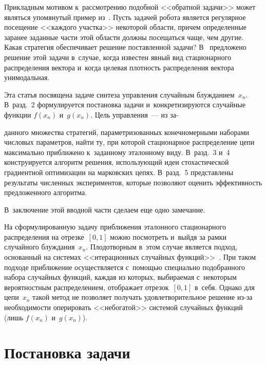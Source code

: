 \begin{multicols}{2}
Прикладным мотивом к~рас\-смот\-ре\-нию по\-доб\-ной <<обратной задачи>> 
может являться упомянутый пример из~\cite{3-kr}. Пусть задачей робота 
является регулярное посещение <<каж\-до\-го участка>> некоторой об\-ласти, 
причем определенные заранее заданные час\-ти этой об\-ласти должны 
посещаться чаще, чем другие. Какая стратегия обеспечивает решение 
поставленной задачи? В~\cite{3-kr} предложено решение этой задачи 
в~случае, когда известен явный вид стационарного распределения вектора 
и~когда целевая плот\-ность распределения вектора уни\-мо\-дальная.
{

}
  
  Эта статья посвящена задаче синтеза управ\-ле\-ния случайным 
блуж\-да\-ни\-ем~$x_n$. В~разд.~2 формулируется постановка задачи 
и~конкретизируются случайные функции $f(x_n)$ и~$g(x_n)$. Цель 
управления~--- из за-\linebreak\vspace*{-12pt}

\columnbreak

\noindent
данного множества стратегий, па\-ра\-мет\-ри\-зо\-ван\-ных 
конечномерными наборами чис\-ло\-вых па\-ра\-мет\-ров, найти ту, при которой 
стационарное распределение цепи максимально приближено к~заданному 
эталонному виду. В~разд.~3 и~4 конструируется алгоритм решения, 
использующий идеи стохастической градиентной оптимизации на 
марковских цепях. В~разд.~5 пред\-став\-ле\-ны результаты чис\-лен\-ных 
экспериментов, которые позволяют оценить эффективность предложенного 
алгоритма.
  
  В~заключение этой вводной час\-ти сделаем еще одно замечание. 
  
  На 
сформулированную задачу приближения эталонного стационарного 
распределения на отрезке~$[0,1]$ мож\-но посмотреть и~выйдя за рамки 
случайного блуж\-да\-ния~$x_n$. Плодотворным в~этом случае является подход, 
основанный на сис\-те\-мах <<итерационных случайных  
функций>>~\cite{8-kr, 12-kr, 13-kr}. При таком подходе при\-бли\-же\-ние 
осуществляется с~по\-мощью специально подобранного набора случайных 
функций, каждая из которых, выбираемая с~некоторым вероятностным 
распределением, отображает отрезок~$[0,1]$ в~себя. Однако для цепи~$x_n$ 
такой метод не позволяет получать удовлетворительное решение из-за 
необходимости оперировать <<небогатой>> сис\-те\-мой случайных функций 
(лишь $f(x_n)$ и~$g(x_n)$).
{

}
  
  \section{Постановка задачи}
  

\end{multicols}
